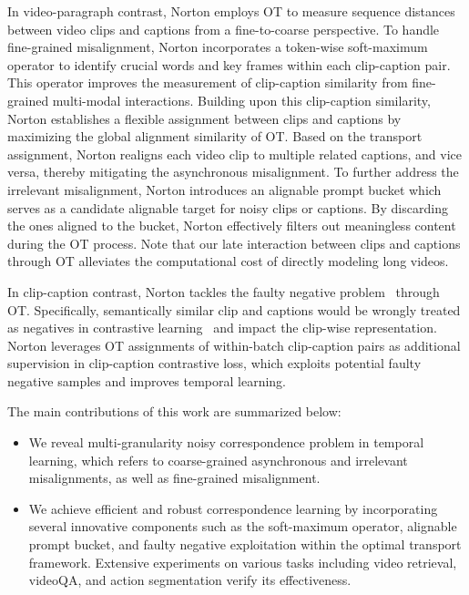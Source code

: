 In video-paragraph contrast, Norton employs OT to measure sequence distances between video clips and captions from a fine-to-coarse perspective. To handle fine-grained misalignment, Norton incorporates a token-wise soft-maximum operator to identify crucial words and key frames within each clip-caption pair. This operator improves the measurement of clip-caption similarity from fine-grained multi-modal interactions. Building upon this clip-caption similarity, Norton establishes a flexible assignment between clips and captions by maximizing the global alignment similarity of OT. 
Based on the transport assignment, Norton realigns each video clip to multiple related captions, and vice versa, thereby mitigating the asynchronous misalignment. To further address the irrelevant misalignment, Norton introduces an alignable prompt bucket which serves as a candidate alignable target for noisy clips or captions.
By discarding the ones aligned to the bucket, Norton effectively filters out meaningless content during the OT process. Note that our late interaction between clips and captions through OT alleviates the computational cost of directly modeling long videos.

In clip-caption contrast, Norton tackles the faulty negative problem~\citep{chuang2020debiased,yang2021partially} through OT. Specifically, semantically similar clip and captions would be wrongly treated as negatives in contrastive learning~\citep{chen2020simple,lin2021completer,lin2022dcp,liu2022scc} and impact the clip-wise representation. Norton leverages OT assignments of within-batch clip-caption pairs as additional supervision in clip-caption contrastive loss, which exploits potential faulty negative samples and improves temporal learning.

The main contributions of this work are summarized below:
\begin{itemize}
[leftmargin=*,topsep=-1pt,itemsep=0ex]
\item We reveal multi-granularity noisy correspondence problem in temporal learning, which refers to coarse-grained asynchronous and irrelevant misalignments, as well as fine-grained misalignment.
\item We achieve efficient and robust  correspondence learning by incorporating several innovative components such as the soft-maximum operator, alignable prompt bucket, and faulty negative exploitation within the optimal transport framework. Extensive experiments on various tasks including video retrieval, videoQA, and action segmentation verify its effectiveness. 
\end{itemize}

